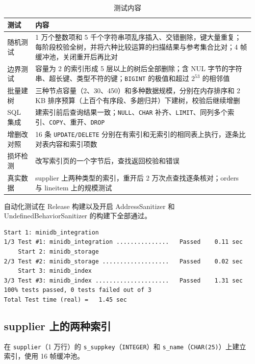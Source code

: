 \documentclass[11pt,a4paper]{ctexart}
\newcommand{\code}[1]{\texttt{#1}}
\begin{document}
\begin{table}[H]
  \centering
  \caption{测试内容}
  \begin{tabularx}{\textwidth}{l X}
    \toprule
    测试 & 内容 \\
    \midrule
    随机测试 & 1 万个整数项和 5 千个字符串项乱序插入、交错删除，键大量重复；每阶段校验全树，并将六种比较运算的扫描结果与参考集合比对；4 帧缓冲池，关闭重开后再比对 \\
    边界测试 & 容量为 2 的索引形成 5 层以上的树后全部删除；含 NUL 字节的字符串、超长键、类型不符的键；\code{BIGINT} 的极值和超过 $2^{53}$ 的相邻值 \\
    批量建树 & 三种节点容量（2、30、450）和多种数据规模，分别在内存排序和 2 KB 排序预算（上百个有序段、多趟归并）下建树，校验后继续增删 \\
    SQL 集成 & 建索引前后查询结果一致；\code{NULL}、\code{CHAR} 补齐、\code{LIMIT}、同列多个索引、\code{COPY}、重开、\code{DROP} \\
    增删改对照 & 16 条 \code{UPDATE/DELETE} 分别在有索引和无索引的相同表上执行，逐条比对表内容和索引项数 \\
    损坏检测 & 改写索引页的一个字节后，查找返回校验和错误 \\
    真实数据 & supplier 上两种类型的索引，重开后 2 万次点查找逐条核对；orders 与 lineitem 上的规模测试 \\
    \bottomrule
  \end{tabularx}
\end{table}

自动化测试在 Release 构建以及开启 AddressSanitizer 和 UndefinedBehaviorSanitizer 的构建下全部通过。

\begin{lstlisting}[style=plain]
    Start 1: minidb_integration
1/3 Test #1: minidb_integration ...............   Passed    0.11 sec
    Start 2: minidb_storage
2/3 Test #2: minidb_storage ...................   Passed    0.02 sec
    Start 3: minidb_index
3/3 Test #3: minidb_index .....................   Passed    1.31 sec
100% tests passed, 0 tests failed out of 3
Total Test time (real) =   1.45 sec
\end{lstlisting}

\subsection{supplier 上的两种索引}

在 \code{supplier}（1 万行）的 \code{s\_suppkey}（\code{INTEGER}）和 \code{s\_name}（\code{CHAR(25)}）上建立索引，使用 16 帧缓冲池。
\end{document}
